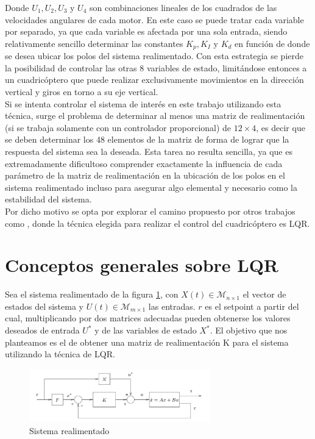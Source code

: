 \documentclass[main]{subfiles}
\begin{document}
Donde $U_1, U_2, U_3$ y $U_4$ son combinaciones lineales de los cuadrados de las velocidades angulares de cada motor. En este caso se puede tratar cada variable por separado, ya que cada variable es afectada por una sola entrada, siendo relativamente sencillo determinar las constantes $K_p, K_I$ y $K_d$ en funci\'on de donde se desea ubicar los polos del sistema realimentado. Con esta estrategia se pierde la posibilidad de controlar las otras 8 variables de estado, limit\'andose entonces a un cuadric\'optero que puede realizar exclusivamente movimientos en la direcci\'on vertical y giros en torno a su eje vertical.\\

Si se intenta controlar el sistema de inter\'es en este trabajo utilizando esta t\'ecnica, surge el problema de determinar al menos una matriz de realimentaci\'on (si se trabaja solamente con un controlador proporcional) de $12\times4$, es decir que se deben determinar los 48 elementos de la matriz de forma de lograr que la respuesta del sistema sea la deseada. Esta tarea no resulta sencilla, ya que es extremadamente dificultoso comprender exactamente la influencia de cada par\'ametro de la matriz de realimentaci\'on en la ubicaci\'on de los polos en el sistema realimentado incluso para asegurar algo elemental y necesario como la estabilidad del sistema.\\

Por dicho motivo se opta por explorar el camino propuesto por otros trabajos como \cite{bib:lqr-discreto}, donde la t\'ecnica elegida para realizar el control del cuadric\'optero es LQR.


\section{Conceptos generales sobre LQR}

Sea el sistema realimentado de la figura \ref{fig:bloque}, con $X(t)\in \mathcal{M}_{n\times1}$ el vector de estados del sistema y $U(t)\in \mathcal{M}_{m\times1}$ las entradas. $r$ es el setpoint a partir del cual, multiplicando por dos matrices adecuadas pueden obtenerse los valores deseados de entrada $U^*$ y de las variables de estado $X^*$. El objetivo que nos planteamos es el de obtener una matriz de realimentaci\'on K para el sistema utilizando la t\'ecnica de LQR. 

\begin{figure}[h!]
	\centering
	\includegraphics[width=0.7\textwidth]{./pics_control/bloque.pdf}
	\caption{Sistema realimentado}
	\label{fig:bloque}
\end{figure}
 
\end{document}
